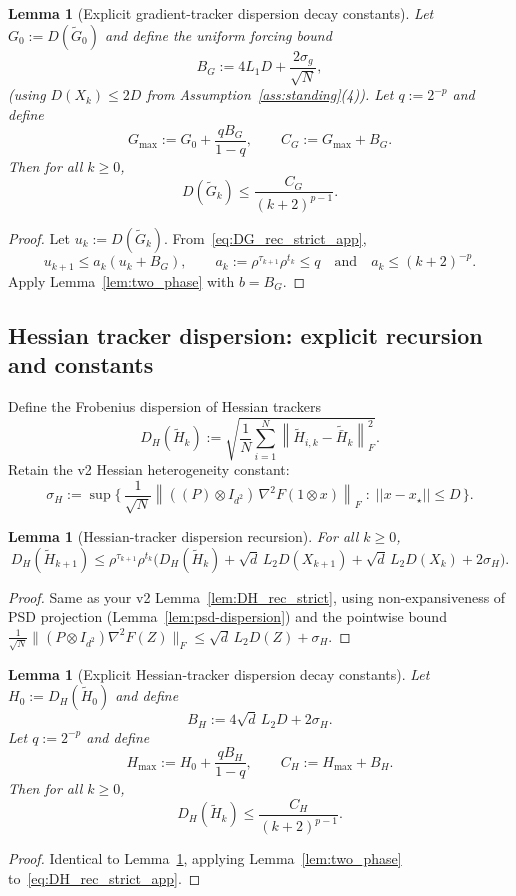 \documentclass[11pt,a4paper]{article}
\def\one{1}%
\def\J{J}%
\def\Pmat{P}%
\def\norm#1{||#1||}%
\newtheorem{lemma}[theorem]{Lemma}
\newcommand{\one}{\mathbf{1}}
\newcommand{\norm}[1]{\left\|#1\right\|}
\newcommand{\normF}[1]{\left\|#1\right\|_F}
\newcommand{\J}{\left(\frac{1}{N}\one\one^\top\right)}
\newcommand{\Pmat}{I-\J}
\begin{document}
\begin{lemma}[Explicit gradient-tracker dispersion decay constants]\label{lem:DG_decay_constants}
	Let $G_{0}:=D(\tilde G_0)$ and define the uniform forcing bound
	\[
	B_G:=4L_1D+\frac{2\sigma_g}{\sqrt N},
	\]
	(using $D(X_k)\le 2D$ from Assumption~\ref{ass:standing}(4)).
	Let $q:=2^{-p}$ and define
	\[
	G_{\max}:=G_0+\frac{qB_G}{1-q},
	\qquad
	C_G:=G_{\max}+B_G.
	\]
	Then for all $k\ge 0$,
	\begin{equation}\label{eq:DG_decay_app}
		D(\tilde G_k)\le \frac{C_G}{(k+2)^{p-1}}.
	\end{equation}
\end{lemma}
\begin{proof}
	Let $u_k:=D(\tilde G_k)$. From~\eqref{eq:DG_rec_strict_app},
	\[
	u_{k+1}\le a_k(u_k+B_G),
	\qquad
	a_k:=\rho^{\tau_{k+1}}\rho^{t_k}\le q
	\quad\text{and}\quad a_k\le (k+2)^{-p}.
	\]
	Apply Lemma~\ref{lem:two_phase} with $b=B_G$.
\end{proof}

\subsection{Hessian tracker dispersion: explicit recursion and constants}

Define the Frobenius dispersion of Hessian trackers
\[
D_H(\tilde H_k):=\sqrt{\frac1N\sum_{i=1}^N\normF{\tilde H_{i,k}-\tilde{\bar H}_k}^2}.
\]
Retain the v2 Hessian heterogeneity constant:
\[
\sigma_H := \sup\Big\{\, \frac{1}{\sqrt N}\normF{((\Pmat)\otimes I_{d^2})\,\nabla^2 F(\one\otimes x)}\;:\; \norm{x-x_\star}\le D\,\Big\}.
\]

\begin{lemma}[Hessian-tracker dispersion recursion]\label{lem:DH_rec_strict_app}
	For all $k\ge 0$,
	\begin{equation}\label{eq:DH_rec_strict_app}
		D_H(\tilde H_{k+1})
		\le \rho^{\tau_{k+1}}\rho^{t_k}\Big(D_H(\tilde H_k)+\sqrt d\,L_2 D(X_{k+1})+\sqrt d\,L_2 D(X_k)+2\sigma_H\Big).
	\end{equation}
\end{lemma}
\begin{proof}
	Same as your v2 Lemma~\ref{lem:DH_rec_strict}, using non-expansiveness of PSD projection (Lemma~\ref{lem:psd-dispersion})
	and the pointwise bound
	$\frac{1}{\sqrt N}\|(\Pmat\otimes I_{d^2})\nabla^2F(Z)\|_F\le \sqrt d\,L_2 D(Z)+\sigma_H$.
\end{proof}

\begin{lemma}[Explicit Hessian-tracker dispersion decay constants]\label{lem:DH_decay_constants}
	Let $H_0:=D_H(\tilde H_0)$ and define
	\[
	B_H:=4\sqrt d\,L_2D+2\sigma_H.
	\]
	Let $q:=2^{-p}$ and define
	\[
	H_{\max}:=H_0+\frac{qB_H}{1-q},
	\qquad
	C_H:=H_{\max}+B_H.
	\]
	Then for all $k\ge 0$,
	\begin{equation}\label{eq:DH_decay_app}
		D_H(\tilde H_k)\le \frac{C_H}{(k+2)^{p-1}}.
	\end{equation}
\end{lemma}
\begin{proof}
	Identical to Lemma~\ref{lem:DG_decay_constants}, applying Lemma~\ref{lem:two_phase} to~\eqref{eq:DH_rec_strict_app}.
\end{proof}
\end{document}
